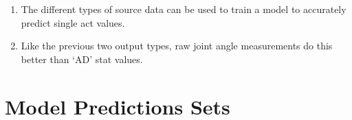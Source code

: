 \documentclass[12pt,twoside]{report}
\begin{document}
\begin{enumerate}
	\item The different types of source data can be used to train a model to accurately predict single act values.
	\item Like the previous two output types, raw joint angle measurements do this better than ‘AD’ stat values.
\end{enumerate}












\chapter{Model Predictions Sets\\}



























\end{document}

